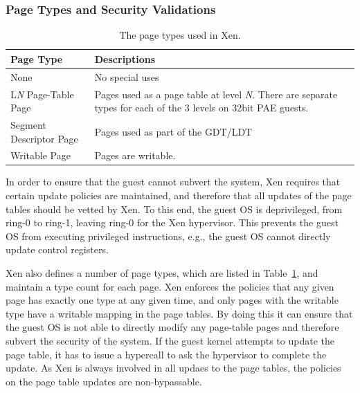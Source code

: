 \subsubsection{Page Types and Security Validations}\label{sec:pv-security}
\begin{table}[!ht]
\begin{center}
\begin{tabular}{|p{1.7cm}|p{4.3cm}|}
\hline
{\textbf{Page Type}}  & {\textbf{Descriptions}}     \\ \hline
None & No special uses \\ \hline
L\emph{N} Page-Table Page & Pages used as a page table at level \emph{N}. There are separate types for each of the 3 levels on 32bit PAE guests. \\ \hline
Segment Descriptor Page & Pages used as part of the GDT/LDT \\ \hline
Writable Page & Pages are writable. \\ \hline
\end{tabular}
\end{center}
\caption{The page types used in Xen.}
\label{tab:pagetype}
\end{table}

In order to ensure that the guest cannot subvert the system, Xen requires that certain update policies are maintained, 
and therefore that all updates of the page tables should be vetted by Xen. 
To this end, the guest OS is deprivileged, from ring-0 to ring-1, leaving ring-0 for the Xen hypervisor.
This prevents the guest OS from executing privileged instructions, e.g., the guest OS cannot directly update control registers.

Xen also defines a number of page types, which are listed in Table~\ref{tab:pagetype}, and maintain a type count for each page.
Xen enforces the policies that any given page has exactly one type at any given time, 
and only pages with the writable type have a writable mapping in the page tables. 
By doing this it can ensure that the guest OS is not able to directly modify any page-table pages and therefore subvert the security of the system.
If the guest kernel attempts to update the page table, it has to issue a hypercall to ask the hypervisor to complete the update.
As Xen is always involved in all updaes to the page tables, the policies on the page table updates are non-bypassable.


